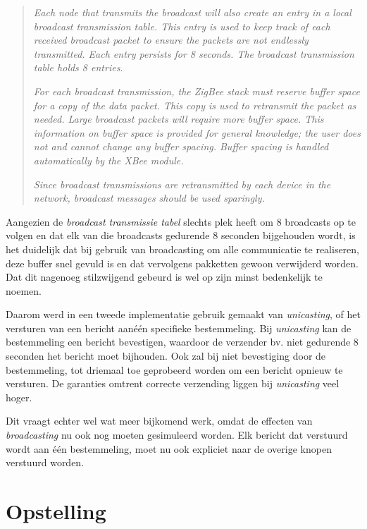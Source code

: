 \begin{quote}

\emph{Each node that transmits the broadcast will also create an entry in a
local broadcast transmission table. This entry is used to keep track of each
received broadcast packet to ensure the packets are not endlessly transmitted.
Each entry persists for 8 seconds. The broadcast transmission table holds 8
entries.}

\emph{For each broadcast transmission, the ZigBee stack must reserve buffer
space for a copy of the data packet. This copy is used to retransmit the packet
as needed. Large broadcast packets will require more buffer space. This
information on buffer space is provided for general knowledge; the user does
not and cannot change any buffer spacing. Buffer spacing is handled
automatically by the XBee module.}

\emph{Since broadcast transmissions are retransmitted by each device in the
network, broadcast messages should be used sparingly.}

\end{quote}

Aangezien de \emph{broadcast transmissie tabel} slechts plek heeft om 8
broadcasts op te volgen en dat elk van die broadcasts gedurende 8 seconden
bijgehouden wordt, is het duidelijk dat bij gebruik van broadcasting om alle
communicatie te realiseren, deze buffer snel gevuld is en dat vervolgens
pakketten gewoon verwijderd worden. Dat dit nagenoeg stilzwijgend gebeurd is
wel op zijn minst bedenkelijk te noemen.

Daarom werd in een tweede implementatie gebruik gemaakt van \emph{unicasting},
of het versturen van een bericht aan\'e\'en specifieke bestemmeling. Bij
\emph{unicasting} kan de bestemmeling een bericht bevestigen, waardoor de
verzender bv. niet gedurende 8 seconden het bericht moet bijhouden. Ook zal bij
niet bevestiging door de bestemmeling, tot driemaal toe geprobeerd worden om
een bericht opnieuw te versturen. De garanties omtrent correcte verzending
liggen bij \emph{unicasting} veel hoger.

Dit vraagt echter wel wat meer bijkomend werk, omdat de effecten van
\emph{broadcasting} nu ook nog moeten gesimuleerd worden. Elk bericht dat
verstuurd wordt aan \'e\'en bestemmeling, moet nu ook expliciet naar de overige
knopen verstuurd worden.

\section{Opstelling}

